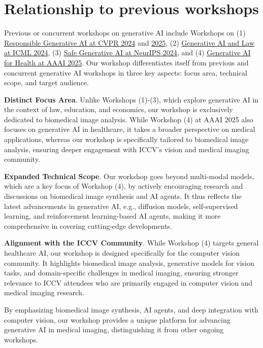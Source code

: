 \documentclass{article}
\def\c#1{\textcolor{gray}{#1}}
\def\x{\textcolor{red}{xxx}}
\begin{document}
\section{Relationship to previous workshops}

Previous or concurrent workshops on generative AI include Workshops on (1) \href{https://cvpr.thecvf.com/virtual/2024/workshop/23674}{Responsible Generative AI at CVPR 2024} and \href{https://sites.google.com/view/cvpr-responsible-genai}{2025}, (2) \href{https://icml.cc/virtual/2024/workshop/29958}{Generative AI and Law at ICML 2024}, (3) \href{https://neurips.cc/virtual/2024/workshop/84705}{Safe Generative AI at NeurIPS 2024}, and (4) \href{https://aaai.org/conference/aaai/aaai-25/workshop-list/}{Generative AI for Health at AAAI 2025}.
Our workshop differentiates itself from previous and concurrent generative AI workshops in three key aspects: focus area, technical scope, and target audience.

 \textbf{Distinct Focus Area}. Unlike Workshops (1)-(3), which explore generative AI in the context of law, education, and economics, our workshop is exclusively dedicated to biomedical image analysis. While Workshop (4) at AAAI 2025 also focuses on generative AI in healthcare, it takes a broader perspective on medical applications, whereas our workshop is specifically tailored to biomedical image analysis, ensuring deeper engagement with ICCV's vision and medical imaging community.

\textbf{Expanded Technical Scope}. Our workshop goes beyond multi-modal models, which are a key focus of Workshop (4), by actively encouraging research and discussions on biomedical image synthesis and AI agents. It thus reflects the latest advancements in generative AI, e.g., diffusion models, self-supervised learning, and reinforcement learning-based AI agents, making it more comprehensive in covering cutting-edge developments.

\textbf{Alignment with the ICCV Community}. While Workshop (4) targets general healthcare AI, our workshop is designed specifically for the computer vision community. It highlights biomedical image analysis, generative models for vision tasks, and domain-specific challenges in medical imaging, ensuring stronger relevance to ICCV attendees who are primarily engaged in computer vision and medical imaging research.


By emphasizing biomedical image synthesis, AI agents, and deep integration with computer vision, our workshop provides a unique platform for advancing generative AI in medical imaging, distinguishing it from other ongoing workshops.
\end{document}
